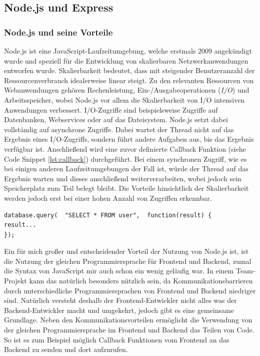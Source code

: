 \documentclass[a4paper,12pt]{report}
\newcommand{\footcite}[1]{\footnotemark\footnotetext{\cite{#1}}}
\begin{document}
        \subsection{Node.js und Express}
        \subsubsection{Node.js und seine Vorteile}
        \label{sec:node.js}
Node.js ist eine JavaScript-Laufzeitumgebung, welche erstmals 2009 angekündigt wurde\footcite{nodeyoutube} und speziell für die Entwicklung von skalierbaren Netzwerkanwendungen entworfen wurde\footcite{nodejs}. Skalierbarkeit bedeutet, dass mit steigender Benutzeranzahl der Ressourcenverbrauch idealerweise linear steigt. Zu den relevanten Ressourcen von Webanwendungen gehören Rechenleistung, Ein-/Ausgabeoperationen (\textit{I/O}) und Arbeitsspeicher, wobei Node.js vor allem die Skalierbarkeit von I/O intensiven Anwendungen verbessert\footcite{nodejsbook}.
I/O-Zugriffe sind beispielsweise Zugriffe auf Datenbanken, Webservices oder auf das Dateisystem. Node.js setzt dabei vollständig auf asynchrone Zugriffe. Dabei wartet der Thread nicht auf das Ergebnis eines I/O-Zugriffs, sondern führt andere Aufgaben aus, bis das Ergebnis verfügbar ist. Anschließend wird eine zuvor definierte Callback Funktion (siehe Code Snippet \ref{lst:callback}) durchgeführt. Bei einem synchronen Zugriff, wie es bei einigen anderen Laufzeitumgebungen der Fall ist, würde der Thread auf das Ergebnis warten und dieses anschließend weiterverarbeiten, wobei jedoch sein Speicherplatz zum Teil belegt bleibt. Die Vorteile hinsichtlich der Skalierbarkeit werden jedoch erst bei einer hohen Anzahl von Zugriffen erkennbar.

\begin{lstlisting}[style=codeStyle, caption={Beispiel einer Callback Funktion \textbf{Quelle: } \cite{nodejsbook}}, label={lst:callback}]
database.query(  "SELECT * FROM user",  function(result) {
result...
});
\end{lstlisting}


Ein für mich großer und entscheidender Vorteil der Nutzung von Node.js ist, ist die Nutzung der gleichen Programmiersprache für Frontend und Backend, zumal die Syntax von JavaScript mir auch schon ein wenig geläufig war.
In einem Team-Projekt kann das natürlich besonders nützlich sein, da Kommunikationsbarrieren durch unterschiedliche Programmiersprachen von Frontend und Backend niedriger sind. Natürlich versteht deshalb der Frontend-Entwickler nicht alles was  der Backend-Entwickler macht und umgekehrt, jedoch gibt es eine gemeinsame Grundlage. Neben den Kommunikationsvorteilen ermöglicht die Verwendung von der gleichen Programmiersprache im Frontend und Backend das Teilen von Code. So ist es zum Beispiel möglich Callback Funktionen vom Frontend an das Backend zu senden und dort aufzurufen.
\end{document}
